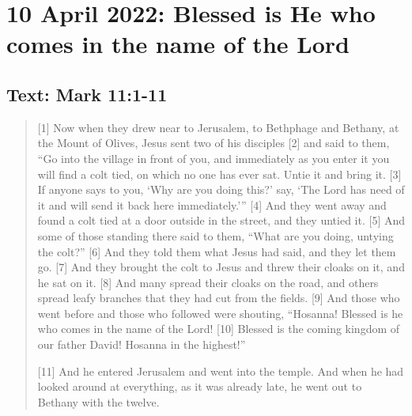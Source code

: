 \section{10 April 2022: Blessed is He who comes in the name of the Lord}
\subsection*{Text: Mark 11:1-11}
  \begin{quote}
    [1] Now when they drew near to Jerusalem, to Bethphage and Bethany, at
    the Mount of Olives, Jesus sent two of his disciples [2] and said to
    them, “Go into the village in front of you, and immediately as you enter
    it you will find a colt tied, on which no one has ever sat.  Untie it and
    bring it.  [3] If anyone says to you, ‘Why are you doing this?’ say, ‘The
    Lord has need of it and will send it back here immediately.’” [4] And
    they went away and found a colt tied at a door outside in the street, and
    they untied it.  [5] And some of those standing there said to them, “What
    are you doing, untying the colt?” [6] And they told them what Jesus had
    said, and they let them go.  [7] And they brought the colt to Jesus and
    threw their cloaks on it, and he sat on it.  [8] And many spread their
    cloaks on the road, and others spread leafy branches that they had cut
    from the fields.  [9] And those who went before and those who followed
    were shouting, “Hosanna!  Blessed is he who comes in the name of the
    Lord!  [10] Blessed is the coming kingdom of our father David!  Hosanna
    in the highest!”

    [11] And he entered Jerusalem and went into the temple.  And when he had
    looked around at everything, as it was already late, he went out to
    Bethany with the twelve.
  \end{quote}
